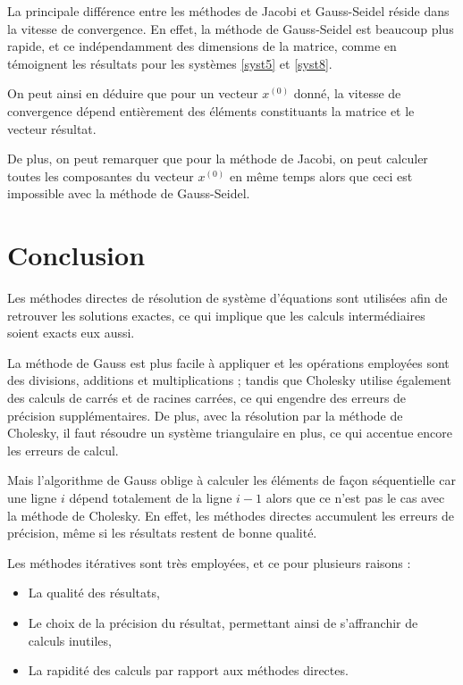 \documentclass{report}
\begin{document}
        \vspace{0.7cm}
        La principale différence entre les méthodes de Jacobi et Gauss-Seidel réside dans la vitesse de convergence. En effet, la méthode de Gauss-Seidel est beaucoup plus rapide, et ce indépendamment des dimensions de la matrice, comme en témoignent les résultats pour les systèmes \eqref{syst5} et \eqref{syst8}.
        
        \vspace{0.7cm}
	On peut ainsi en déduire que pour un vecteur $x^{(0)}$ donné, la vitesse de convergence dépend entièrement des éléments constituants la matrice et le vecteur résultat.
	
	\vspace{0.7cm}
	De plus, on peut remarquer que pour la méthode de Jacobi, on peut calculer toutes les composantes du  vecteur $x^{(0)}$ en même temps alors que ceci est impossible avec la méthode de Gauss-Seidel.
        
        
  \chapter{Conclusion}
  	Les méthodes directes de résolution de système d'équations sont utilisées afin de retrouver les solutions exactes, ce qui implique que les calculs intermédiaires soient exacts eux aussi.
    \vspace{0.3cm}
    
    La méthode de Gauss est plus facile à appliquer et les opérations employées sont des divisions, additions et multiplications ; tandis que Cholesky utilise également des calculs de carrés et de racines carrées, ce qui engendre des erreurs de précision supplémentaires. De plus, avec la résolution par la méthode de Cholesky, il faut résoudre un système triangulaire en plus, ce qui accentue encore les erreurs de calcul.
    
    \vspace{0.3cm}
    Mais l'algorithme de Gauss oblige à calculer les éléments de façon séquentielle car une ligne $i$ dépend totalement de la ligne $i-1$ alors que ce n'est pas le cas avec la méthode de Cholesky.
    En effet, les méthodes directes accumulent les erreurs de précision, même si les résultats restent de bonne qualité.

    \vspace{0.7cm}
    Les méthodes itératives sont très employées, et ce pour plusieurs raisons :
        \begin{itemize}
          \item{La qualité des résultats,}
          \item{Le choix de la précision du résultat, permettant ainsi de s'affranchir de calculs inutiles,}
          \item{La rapidité des calculs par rapport aux méthodes directes.}
        \end{itemize}
    \vspace{0.3cm}
\end{document}
